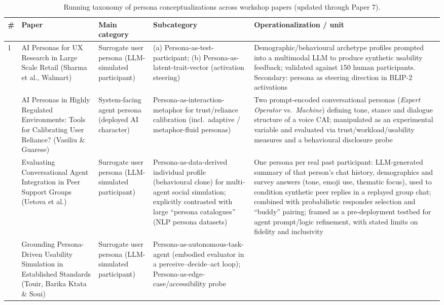 \begin{table}[t]
\centering
\caption{Running taxonomy of persona conceptualizations across workshop papers (updated through Paper 7).}
\label{tab:persona-taxonomy}
\small
\begin{tabular}{p{0.5cm} p{3.6cm} p{3.4cm} p{3.6cm} p{3.6cm}}
\toprule
\textbf{\#} & \textbf{Paper} & \textbf{Main category} & \textbf{Subcategory} & \textbf{Operationalization / unit} \\
\midrule
1 & AI Personas for UX Research in Large Scale Retail (Sharma et al., Walmart) &
Surrogate user persona (LLM-simulated participant) &
(a) Persona-as-test-participant; (b) Persona-as-latent-trait-vector (activation steering) &
Demographic/behavioural archetype profiles prompted into a multimodal LLM to produce synthetic usability feedback; validated against 150 human participants. Secondary: persona as steering direction in BLIP-2 activations \\
\addlinespace
2 & AI Personas in Highly Regulated Environments: Tools for Calibrating User Reliance? (Vasiliu \& Guarese) &
System-facing agent persona (deployed AI character) &
Persona-as-interaction-metaphor for trust/reliance calibration (incl.\ adaptive / metaphor-fluid personas) &
Two prompt-encoded conversational personas (\textit{Expert Operator} vs.\ \textit{Machine}) defining tone, stance and dialogue structure of a voice CAI; manipulated as an experimental variable and evaluated via trust/workload/usability measures and a behavioural disclosure probe \\
\addlinespace
3 & Evaluating Conversational Agent Integration in Peer Support Groups (Uetova et al.) &
Surrogate user persona (LLM-simulated participant) &
Persona-as-data-derived individual profile (behavioural clone) for multi-agent social simulation; explicitly contrasted with large ``persona catalogues'' (NLP persona datasets) &
One persona per real past participant: LLM-generated summary of that person's chat history, demographics and survey answers (tone, emoji use, thematic focus), used to condition synthetic peer replies in a replayed group chat; combined with probabilistic responder selection and ``buddy'' pairing; framed as a pre-deployment testbed for agent prompt/logic refinement, with stated limits on fidelity and inclusivity \\
\addlinespace
4 & Grounding Persona-Driven Usability Simulation in Established Standards (Touir, Barika Ktata \& Soui) &
Surrogate user persona (LLM-simulated participant) &
Persona-as-autonomous-task-agent (embodied evaluator in a perceive--decide--act loop); Persona-as-edge-case/accessibility probe &

\end{tabular}
\end{table}
